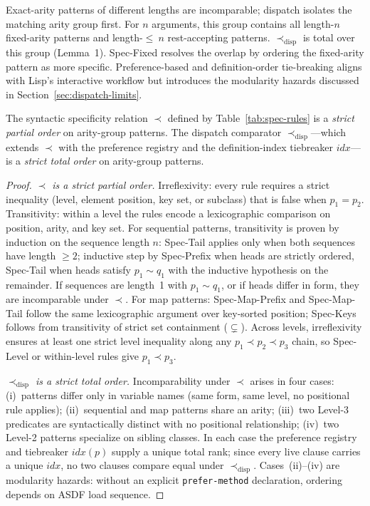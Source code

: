 \documentclass[sigconf,nonacm]{acmart}
\begin{document}
Exact-arity patterns of different lengths are incomparable; dispatch isolates the matching arity group first.
For $n$ arguments, this group contains all length-$n$ fixed-arity patterns and length-$\le~n$ rest-accepting patterns.
$\prec_{\text{disp}}$ is total over this group (Lemma~1).
Spec-Fixed resolves the overlap by ordering the fixed-arity pattern as more specific.
Preference-based and definition-order tie-breaking aligns with Lisp's interactive workflow but introduces the modularity hazards discussed in Section~\ref{sec:dispatch-limits}.

\begin{lemma}
The syntactic specificity relation $\prec$ defined by Table~\ref{tab:spec-rules} is a \textit{strict partial order} on arity-group patterns.
The dispatch comparator $\prec_{\text{disp}}$---which extends $\prec$ with the preference registry and the definition-index tiebreaker $\textit{idx}$---is a \textit{strict total order} on arity-group patterns.
\end{lemma}
\begin{proof}
\textit{$\prec$ is a strict partial order.}
Irreflexivity: every rule requires a strict inequality (level, element position, key set, or subclass) that is false when $p_1 = p_2$.
Transitivity: within a level the rules encode a lexicographic comparison on position, arity, and key set. 
For sequential patterns, transitivity is proven by induction on the sequence length $n$: Spec-Tail applies only when both sequences have length $\ge 2$;
inductive step by Spec-Prefix when heads are strictly ordered, Spec-Tail when heads satisfy $p_1 \sim q_1$ with the inductive hypothesis on the remainder.
If sequences are length~1 with $p_1 \sim q_1$, or if heads differ in form, they are incomparable under $\prec$.
For map patterns: Spec-Map-Prefix and Spec-Map-Tail follow the same lexicographic argument over key-sorted position; Spec-Keys follows from transitivity of strict set containment ($\subsetneq$).
Across levels, irreflexivity ensures at least one strict level inequality along any $p_1 \prec p_2 \prec p_3$ chain, so Spec-Level or within-level rules give $p_1 \prec p_3$.

\textit{$\prec_{\text{disp}}$ is a strict total order.}
Incomparability under $\prec$ arises in four cases: (i)~patterns differ only in variable names (same form, same level, no positional rule applies); (ii)~sequential and map patterns share an arity;
(iii)~two Level-3 predicates are syntactically distinct with no positional relationship; (iv)~two Level-2 patterns specialize on sibling classes.
In each case the preference registry and tiebreaker $\textit{idx}(p)$ supply a unique total rank; since every live clause carries a unique $\textit{idx}$, no two clauses compare equal under $\prec_{\text{disp}}$.
Cases~(ii)--(iv) are modularity hazards: without an explicit \texttt{prefer-method} declaration, ordering depends on ASDF load sequence.
\end{proof}
\end{document}
